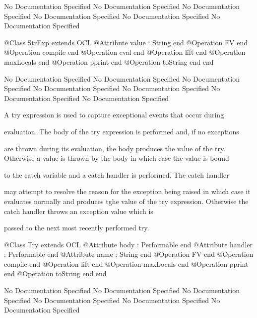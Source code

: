 No Documentation Specified
No Documentation Specified
No Documentation Specified
No Documentation Specified
No Documentation Specified
No Documentation Specified
\begin{Interface}
@Class StrExp extends OCL
  @Attribute value : String end
  @Operation FV end
  @Operation compile end
  @Operation eval end
  @Operation lift end
  @Operation maxLocals end
  @Operation pprint end
  @Operation toString end
end
\end{Interface}
No Documentation Specified
No Documentation Specified
No Documentation Specified
No Documentation Specified
No Documentation Specified
No Documentation Specified
No Documentation Specified

       A try expression is used to capture exceptional events that occur during

       evaluation. The body of the try expression is performed and, if no exceptions

       are thrown during its evaluation, the body produces the value of the try.
       Otherwise a value is thrown by the body in which case the value is bound

       to the catch variable and a catch handler is performed. The catch handler

       may attempt to resolve the reason for the exception being raised in 
       which case it evaluates normally and produces tghe value of the try 
       expression. Otherwise the catch handler throws an exception value which is

       passed to the next most recently performed try.
\begin{Interface}
@Class Try extends OCL
  @Attribute body : Performable end
  @Attribute handler : Performable end
  @Attribute name : String end
  @Operation FV end
  @Operation compile end
  @Operation lift end
  @Operation maxLocals end
  @Operation pprint end
  @Operation toString end
end
\end{Interface}
No Documentation Specified
No Documentation Specified
No Documentation Specified
No Documentation Specified
No Documentation Specified
No Documentation Specified

